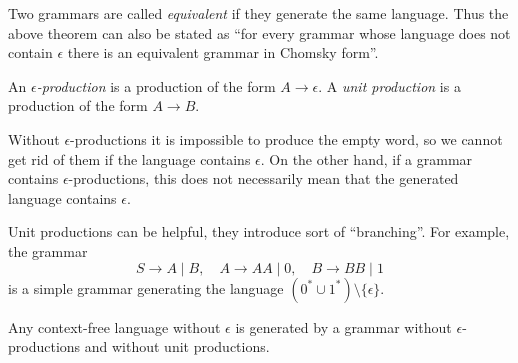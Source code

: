 \begin{page}


Two grammars are called \emph{equivalent} if they generate the same language.
Thus the above theorem can also be stated as
``for every grammar whose language does not contain $\epsilon$ there is an equivalent grammar in Chomsky form''.


\end{page}

\begin{page}

\begin{dfn}
An \emph{$\epsilon$-production} is a production of the form $A \to \epsilon$.
A \emph{unit production} is a production of the form $A \to B$.
\end{dfn}

\end{page}

\begin{page}


Without $\epsilon$-productions it is impossible to produce the empty word,
so we cannot get rid of them if the language contains $\epsilon$.
On the other hand, if a grammar contains $\epsilon$-productions,
this does not necessarily mean that the generated language contains $\epsilon$.

Unit productions can be helpful, they introduce sort of ``branching''. For example, the grammar
\[
S \to A \mid B, \quad A \to AA \mid 0, \quad B \to BB \mid 1
\]
is a simple grammar generating the language $(0^* \cup 1^*) \setminus \{\epsilon\}$.



\end{page}

\begin{page}

\begin{lem}
\label{lem:NoENoUnit}
Any context-free language without $\epsilon$ is generated by a grammar without $\epsilon$-productions and without unit productions.
\end{lem}

\end{page}

